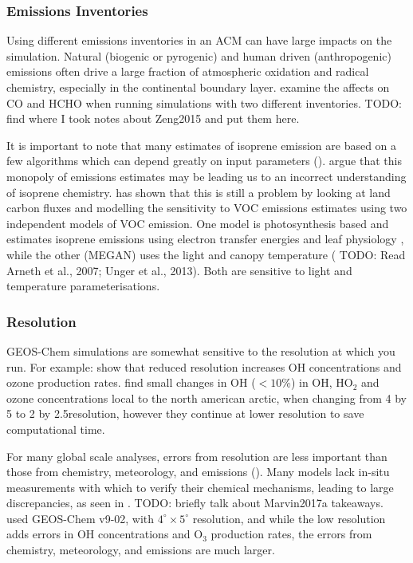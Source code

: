     
    \subsubsection{Emissions Inventories}
      Using different emissions inventories in an ACM can have large impacts on the simulation.
      Natural (biogenic or pyrogenic) and human driven (anthropogenic) emissions often drive a large fraction of atmospheric oxidation and radical chemistry, especially in the continental boundary layer.
      \cite{Zeng2015} examine the affects on CO and HCHO when running simulations with two different inventories.
      TODO: find where I took notes about Zeng2015 and put them here.
      
      It is important to note that many estimates of isoprene emission are based on a few algorithms which can depend greatly on input parameters (\cite{Arneth2008,Niinemets2010}).
      \cite{Arneth2008} argue that this monopoly of emissions estimates may be leading us to an incorrect understanding of isoprene chemistry.
      \cite{Yue2015} has shown that this is still a problem by looking at land carbon fluxes and modelling the sensitivity to VOC emissions estimates using two independent models of VOC emission.
      One model is photosynthesis based and estimates isoprene emissions using electron transfer energies and leaf physiology \citep{Niinemets1999}, while the other (MEGAN) uses the light and canopy temperature (\citep{Guenther1995,Arneth2007} TODO: Read Arneth et al., 2007; Unger et al., 2013).
      Both are sensitive to light and temperature parameterisations.
    
      
    \subsubsection{Resolution}
      \label{LR:Models:Uncert:Resolution}
      GEOS-Chem simulations are somewhat sensitive to the resolution at which you run.
      For example: \cite{Wild2006} show that reduced resolution increases OH concentrations and ozone production rates.
      \cite{Christian2017} find small changes in OH ($<10$\%) in OH, HO$_2$ and ozone concentrations local to the north american arctic, when changing from 4 by 5 to 2 by 2.5\degr resolution, however they continue at lower resolution to save computational time.
    
      For many global scale analyses, errors from resolution are less important than those from chemistry, meteorology, and emissions (\cite{Christian2017}).
      Many models lack in-situ measurements with which to verify their chemical mechanisms, leading to large discrepancies, as seen in \cite{Marvin2017a}.
      TODO: briefly talk about Marvin2017a takeaways.
      \cite{Christian2017} used GEOS-Chem v9-02, with $4^{\circ} \times 5^{\circ}$ resolution, and while the low resolution adds errors in OH concentrations and O$_3$ production rates, the errors from chemistry, meteorology, and emissions are much larger.
            
